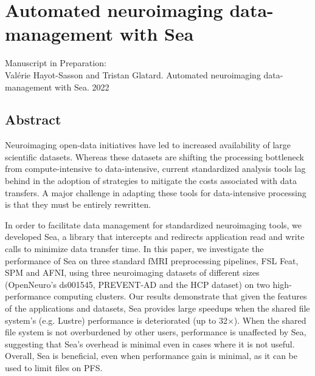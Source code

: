 \chapter{Automated neuroimaging data-management with Sea}\label{chapter:sea-neuro}


Manuscript in Preparation:\\
Val\'erie Hayot-Sasson and Tristan Glatard. Automated neuroimaging data-management with Sea. 2022 \\
\section{Abstract}

	Neuroimaging open-data initiatives have led to increased availability of large
  scientific datasets. Whereas these datasets are shifting the processing
  bottleneck from compute-intensive to data-intensive, current standardized
  analysis tools lag behind in the adoption of strategies to mitigate the costs
  associated with data transfers. A major challenge in adapting these tools for
  data-intensive processing is that they must be entirely rewritten.
  
  In order to facilitate data management for standardized neuroimaging tools, we
  developed Sea, a library that intercepts and redirects application read and
  write calls to minimize data transfer time. In this paper, we investigate the
  performance of Sea on three standard fMRI preprocessing pipelines, FSL Feat,
  SPM and AFNI, using three neuroimaging datasets of different sizes
  (OpenNeuro's ds001545, PREVENT-AD and the HCP dataset) on two high-performance
  computing clusters. Our results demonstrate that given the features of the
  applications and datasets, Sea provides large speedups when the shared
  file system's (e.g. Lustre) performance is deteriorated (up to 32$\times$).
  When the shared file system is not overburdened by other users, performance is
  unaffected by Sea, suggesting that Sea's overhead is minimal even in cases
  where it is not useful. Overall, Sea is beneficial, even when
  performance gain is minimal, as it can be used to limit files on PFS.
  

